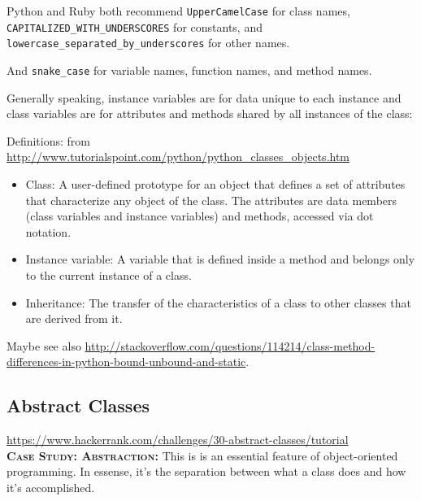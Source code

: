 \documentclass[11pt,a4paper]{article}
\begin{document}
Python and Ruby both recommend {\tt UpperCamelCase} for class names,
{\tt CAPITALIZED\_WITH\_UNDERSCORES} for constants, and {\tt
lowercase\_separated\_by\_underscores} for other names.  

And {\tt snake\_case} for variable names, function names, and method names. 

Generally speaking, instance variables are for data unique to each instance and class variables are for attributes and methods shared by all instances of the class:

Definitions: 
from \href{http://www.tutorialspoint.com/python/python\_classes\_objects.htm}{http://www.tutorialspoint.com/python/python\_classes\_objects.htm}
\begin{itemize}
\item{Class: A user-defined prototype for an object that defines a set of
    attributes that characterize any object of the class. The attributes
    are data members (class variables and instance variables) and methods,
    accessed via dot notation.}


\item{Instance variable: A variable that is defined inside a method
    and belongs only to the current instance of a class.}

\item{Inheritance: The transfer of the characteristics of a class to
    other classes that are derived from it.}
\end{itemize}

Maybe see also \href{http://stackoverflow.com/questions/114214/class-method-differences-in-python-bound-unbound-and-static}{http://stackoverflow.com/questions/114214/class-method-differences-in-python-bound-unbound-and-static}. 


    \subsection{Abstract Classes}
    \href{https://www.hackerrank.com/challenges/30-abstract-classes/tutorial}{https://www.hackerrank.com/challenges/30-abstract-classes/tutorial} \\

    \textbf{\textsc{Case Study: Abstraction:}}
    This is is an essential feature of object-oriented programming. In essense, it's the separation between what a class does and how it's accomplished. 
\end{document}
